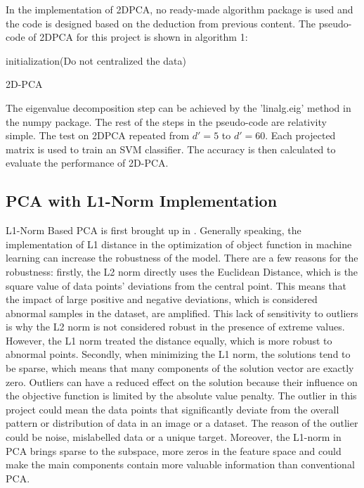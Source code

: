 \documentclass{cta-author}
\begin{document}
In the implementation of 2DPCA, no ready-made algorithm package is used and the code is designed based on the deduction from previous content.
The pseudo-code of 2DPCA for this project is shown in algorithm 1:

\begin{algorithm}[H]
 initialization(Do not centralized the data)\;
 \caption{2D-PCA}
\end{algorithm}
The eigenvalue decomposition step can be achieved by the 'linalg.eig' method in the numpy package. The rest of the steps in the pseudo-code are relativity simple.
The test on 2DPCA repeated from $d' = 5$ to $d' =60$. Each projected matrix is used to train an SVM classifier. The accuracy is then calculated to evaluate the performance of 2D-PCA.
\subsection{PCA with L1-Norm Implementation}
L1-Norm Based PCA is first brought up in \cite{25}. 
Generally speaking, the implementation of L1 distance in the optimization of object function in machine learning can increase the robustness of the model. There are a few reasons for the robustness: firstly, the L2 norm directly uses the Euclidean Distance, which is the square value of data points' deviations from the central point. This means that the impact of large positive and negative deviations, which is considered abnormal samples in the dataset, are amplified. This lack of sensitivity to outliers is why the L2 norm is not considered robust in the presence of extreme values. However, the L1 norm treated the distance equally, which is more robust to abnormal points. 
Secondly, when minimizing the L1 norm, the solutions tend to be sparse, which means that many components of the solution vector are exactly zero. Outliers can have a reduced effect on the solution because their influence on the objective function is limited by the absolute value penalty.
The outlier in this project could mean the data points that significantly deviate from the overall pattern or distribution of data in an image or a dataset. The reason of the outlier could be noise, mislabelled data or a unique target.
Moreover, the L1-norm in PCA brings sparse to the subspace, more zeros in the feature space and could make the main components contain more valuable information than conventional PCA.
\end{document}
